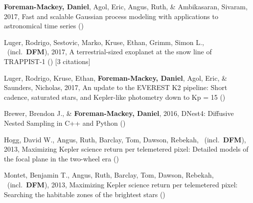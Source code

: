 \item[{\color{numcolor}\scriptsize6}] \textbf{Foreman-Mackey, Daniel}, Agol, Eric, Angus, Ruth, \& Ambikasaran, Sivaram, 2017, Fast and scalable Gaussian process modeling with applications to astronomical time series ()

\item[{\color{numcolor}\scriptsize5}] Luger, Rodrigo, Sestovic, Marko, Kruse, Ethan, Grimm, Simon L., \etal\ (incl.\ \textbf{DFM}), 2017, A terrestrial-sized exoplanet at the snow line of TRAPPIST-1 () [3 citations]

\item[{\color{numcolor}\scriptsize4}] Luger, Rodrigo, Kruse, Ethan, \textbf{Foreman-Mackey, Daniel}, Agol, Eric, \& Saunders, Nicholas, 2017, An update to the EVEREST K2 pipeline: Short cadence, saturated stars, and Kepler-like photometry down to Kp = 15 ()

\item[{\color{numcolor}\scriptsize3}] Brewer, Brendon J., \& \textbf{Foreman-Mackey, Daniel}, 2016, DNest4: Diffusive Nested Sampling in C++ and Python ()

\item[{\color{numcolor}\scriptsize2}] Hogg, David W., Angus, Ruth, Barclay, Tom, Dawson, Rebekah, \etal\ (incl.\ \textbf{DFM}), 2013, Maximizing Kepler science return per telemetered pixel: Detailed models of the focal plane in the two-wheel era ()

\item[{\color{numcolor}\scriptsize1}] Montet, Benjamin T., Angus, Ruth, Barclay, Tom, Dawson, Rebekah, \etal\ (incl.\ \textbf{DFM}), 2013, Maximizing Kepler science return per telemetered pixel: Searching the habitable zones of the brightest stars ()